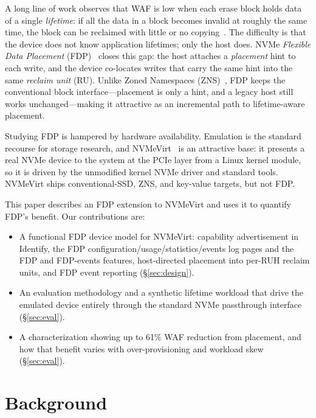 \documentclass[letterpaper,twocolumn,10pt]{article}
\begin{document}
A long line of work observes that WAF is low when each erase block holds data
of a single \emph{lifetime}: if all the data in a block becomes invalid at
roughly the same time, the block can be reclaimed with little or no
copying~\cite{lifetime:hotcold,multistream:hotstorage14}. The difficulty is
that the device does not know application lifetimes; only the host does.
NVMe \emph{Flexible Data Placement} (FDP)~\cite{fdp:tp4146} closes this gap: the
host attaches a \emph{placement} hint to each write, and the device co-locates
writes that carry the same hint into the same \emph{reclaim unit} (RU). Unlike
Zoned Namespaces (ZNS)~\cite{zns:atc21}, FDP keeps the conventional block
interface---placement is only a hint, and a legacy host still works
unchanged---making it attractive as an incremental path to lifetime-aware
placement.

Studying FDP is hampered by hardware availability. Emulation is the standard
recourse for storage research, and NVMeVirt~\cite{nvmevirt:fast23} is an
attractive base: it presents a real NVMe device to the system at the PCIe layer
from a Linux kernel module, so it is driven by the unmodified kernel NVMe
driver and standard tools. NVMeVirt ships conventional-SSD, ZNS, and key-value
targets, but not FDP.

This paper describes an FDP extension to NVMeVirt and uses it to quantify FDP's
benefit. Our contributions are:
\begin{itemize}
  \item A functional FDP device model for NVMeVirt: capability advertisement in
  Identify, the FDP configuration/usage/statistics/events log pages and the FDP
  and FDP-events features, host-directed placement into per-RUH reclaim units,
  and FDP event reporting (\S\ref{sec:design}).
  \item An evaluation methodology and a synthetic lifetime workload that drive
  the emulated device entirely through the standard NVMe passthrough interface
  (\S\ref{sec:eval}).
  \item A characterization showing up to 61\% WAF reduction from placement, and
  how that benefit varies with over-provisioning and workload skew
  (\S\ref{sec:eval}).
\end{itemize}

\section{Background}
\label{sec:bg}
\end{document}
